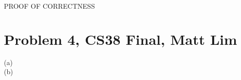 \documentclass{article}
\begin{document}
PROOF OF CORRECTNESS
\newpage

\section*{Problem 4, CS38 Final, Matt Lim}
\begin{description}
    \item[(a)]
    \item[(b)]
\end{description}
\newpage

\end{document}
